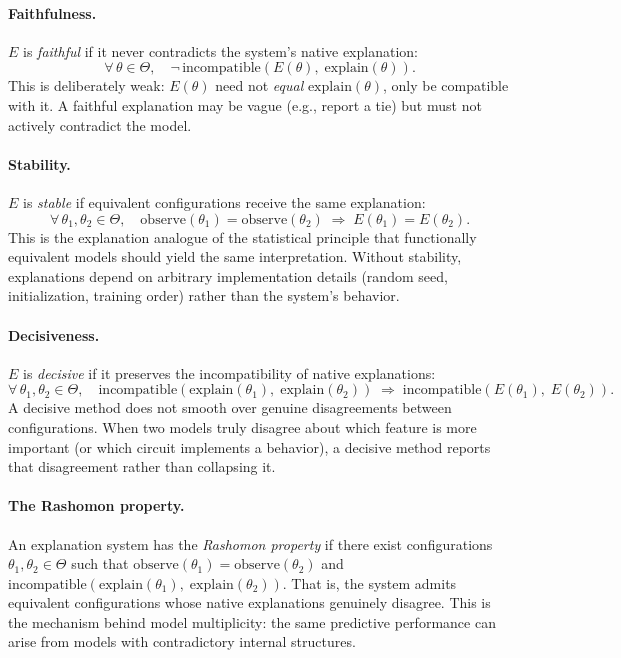 \documentclass{article}
\begin{document}
\paragraph{Faithfulness.}
$E$ is \emph{faithful} if it never contradicts the system's native
explanation:
\[
  \forall\, \theta \in \Theta,\quad
  \neg\,\mathrm{incompatible}(E(\theta),\; \mathrm{explain}(\theta)).
\]
This is deliberately weak: $E(\theta)$ need not \emph{equal}
$\mathrm{explain}(\theta)$, only be compatible with it.
A faithful explanation may be vague (e.g., report a tie) but must not
actively contradict the model.

\paragraph{Stability.}
$E$ is \emph{stable} if equivalent configurations receive the same
explanation:
\[
  \forall\, \theta_1, \theta_2 \in \Theta,\quad
  \mathrm{observe}(\theta_1) = \mathrm{observe}(\theta_2)
  \;\Longrightarrow\;
  E(\theta_1) = E(\theta_2).
\]
This is the explanation analogue of the statistical principle that
functionally equivalent models should yield the same interpretation.
Without stability, explanations depend on arbitrary implementation details
(random seed, initialization, training order) rather than the system's
behavior.

\paragraph{Decisiveness.}
$E$ is \emph{decisive} if it preserves the incompatibility of native
explanations:
\[
  \forall\, \theta_1, \theta_2 \in \Theta,\quad
  \mathrm{incompatible}(\mathrm{explain}(\theta_1),\;
  \mathrm{explain}(\theta_2))
  \;\Longrightarrow\;
  \mathrm{incompatible}(E(\theta_1),\; E(\theta_2)).
\]
A decisive method does not smooth over genuine disagreements between
configurations.
When two models truly disagree about which feature is more important
(or which circuit implements a behavior), a decisive method reports
that disagreement rather than collapsing it.

\paragraph{The Rashomon property.}
An explanation system has the \emph{Rashomon property} if there exist
configurations $\theta_1, \theta_2 \in \Theta$ such that
$\mathrm{observe}(\theta_1) = \mathrm{observe}(\theta_2)$ and
$\mathrm{incompatible}(\mathrm{explain}(\theta_1),\;
\mathrm{explain}(\theta_2))$.
That is, the system admits equivalent configurations whose native
explanations genuinely disagree.
This is the mechanism behind model multiplicity: the same predictive
performance can arise from models with contradictory internal structures.
\end{document}
